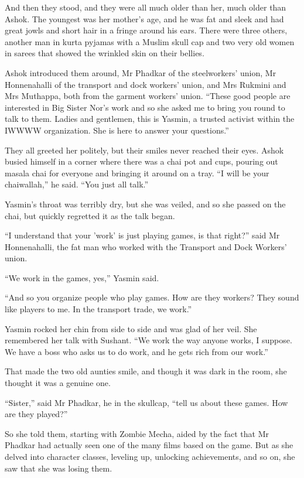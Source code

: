And then they stood, and they were all much older than her, much
older than Ashok. The youngest was her mother's age, and he was fat
and sleek and had great jowls and short hair in a fringe around his
ears. There were three others, another man in kurta pyjamas with a
Muslim skull cap and two very old women in sarees that showed the
wrinkled skin on their bellies.

Ashok introduced them around, Mr Phadkar of the steelworkers'
union, Mr Honnenahalli of the transport and dock workers' union,
and Mrs Rukmini and Mrs Muthappa, both from the garment workers'
union. ``These good people are interested in Big Sister Nor's work
and so she asked me to bring you round to talk to them. Ladies and
gentlemen, this is Yasmin, a trusted activist within the IWWWW
organization. She is here to answer your questions.''

They all greeted her politely, but their smiles never reached their
eyes. Ashok busied himself in a corner where there was a chai pot
and cups, pouring out masala chai for everyone and bringing it
around on a tray. ``I will be your chaiwallah,'' he said. ``You just
all talk.''

Yasmin's throat was terribly dry, but she was veiled, and so she
passed on the chai, but quickly regretted it as the talk began.

``I understand that your 'work' is just playing games, is that
right?'' said Mr Honnenahalli, the fat man who worked with the
Transport and Dock Workers' union.

``We work in the games, yes,'' Yasmin said.

``And so you organize people who play games. How are they workers?
They sound like players to me. In the transport trade, we work.''

Yasmin rocked her chin from side to side and was glad of her veil.
She remembered her talk with Sushant. ``We work the way anyone
works, I suppose. We have a boss who asks us to do work, and he
gets rich from our work.''

That made the two old aunties smile, and though it was dark in the
room, she thought it was a genuine one.

``Sister,'' said Mr Phadkar, he in the skullcap, ``tell us about these
games. How are they played?''

So she told them, starting with Zombie Mecha, aided by the fact
that Mr Phadkar had actually seen one of the many films based on
the game. But as she delved into character classes, leveling up,
unlocking achievements, and so on, she saw that she was losing
them.

